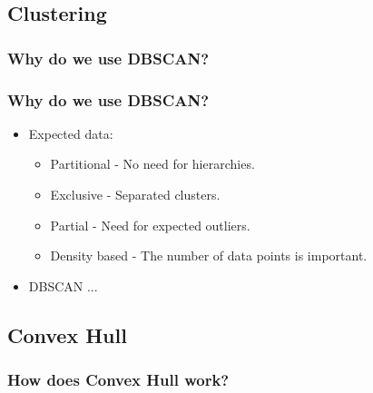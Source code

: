 \subsection{Clustering}
\subsubsection{Why do we use DBSCAN?} %
\begin{frame}
\frametitle{Why do we use DBSCAN?}
	\begin{itemize}
		\item Expected data:
		\begin{itemize}
			\item Partitional - No need for hierarchies.
			\item Exclusive - Separated clusters.
			\item Partial - Need for expected outliers.
			\item Density based - The number of data points is important.
		\end{itemize}
		\item DBSCAN ...
	\end{itemize}
\end{frame}	


\subsection{Convex Hull}
\subsubsection{How does Convex Hull work?}

